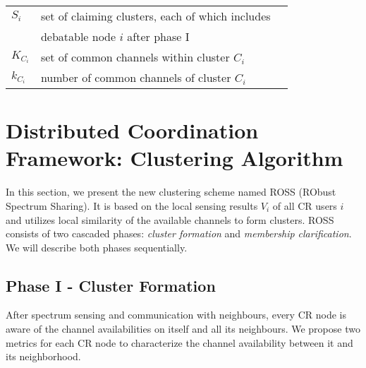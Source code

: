 \begin{table}[ht!]
\begin{tabular}{llr}
$S_i$ & set of claiming clusters, each of which includes \\
& debatable node $i$ after phase I\\
$K_{C_i}$ & set of common channels within cluster $C_i$\\
$k_{C_i}$ & number of common channels of cluster $C_i$\\
\bottomrule
\end{tabular}
\end{table}





\section{Distributed Coordination Framework: Clustering Algorithm}
\label{ross}



In this section, we present the new clustering scheme named ROSS (RObust Spectrum Sharing). It is based on the local sensing results $V_{i}$ of all CR users $i$ and utilizes local similarity of the available channels to form clusters. ROSS consists of two cascaded phases: \textit{cluster formation} and \textit{membership clarification}. We will describe both phases sequentially.

\subsection{Phase I - Cluster Formation}
After spectrum sensing and communication with neighbours, every CR node is aware of the channel availabilities on itself and all its neighbours.
We propose two metrics for each CR node to characterize the channel availability between it and its neighborhood.

